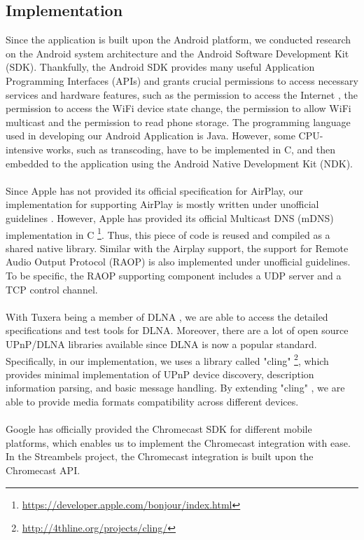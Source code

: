 \subsection{Implementation\label{3_2}}
Since the application is built upon the Android platform, we conducted research
on the Android system architecture and the Android Software Development Kit
(SDK). Thankfully, the Android SDK provides many useful Application Programming
Interfaces (APIs) and grants crucial permissions to access necessary services
and hardware features, such as the permission to access the Internet , the
permission to access the WiFi device state change, the permission to allow WiFi
multicast and  the permission to read phone storage. The programming language
used in developing our Android Application is Java. However, some CPU-intensive
works, such as transcoding, have to be implemented in C, and then embedded to
the application using the Android Native Development Kit (NDK).\\
\\
Since Apple has not provided its official specification for AirPlay, our
implementation for supporting AirPlay is mostly written under unofficial
guidelines \cite{AirPlay-spec}. However, Apple has provided its official
Multicast DNS (mDNS) implementation in C
\footnote{\url{https://developer.apple.com/bonjour/index.html}}. Thus, this
piece of code is reused and compiled as a shared native library. Similar with
the Airplay support, the support for Remote Audio Output Protocol (RAOP) is
also implemented under unofficial guidelines.
To be specific, the RAOP supporting component includes a UDP server and a TCP
control channel.\\
\\
With Tuxera being a member of DLNA , we are able to access the detailed specifications and test tools for DLNA. Moreover,  there are a lot of open source UPnP/DLNA
 libraries available since DLNA is now a popular standard. Specifically, in our
 implementation, we uses a library called "cling" \cite{cling}
 \footnote{\url{http://4thline.org/projects/cling/}}, which provides minimal
 implementation of UPnP device discovery, description information parsing, and basic message handling. By extending "cling" \cite{cling}, we are able to provide media formats compatibility across different devices.\\
\\
Google has officially provided the Chromecast SDK for different mobile platforms, which enables us to  implement the Chromecast integration with ease. In the Streambels project, the Chromecast integration is built upon the Chromecast API.\\
